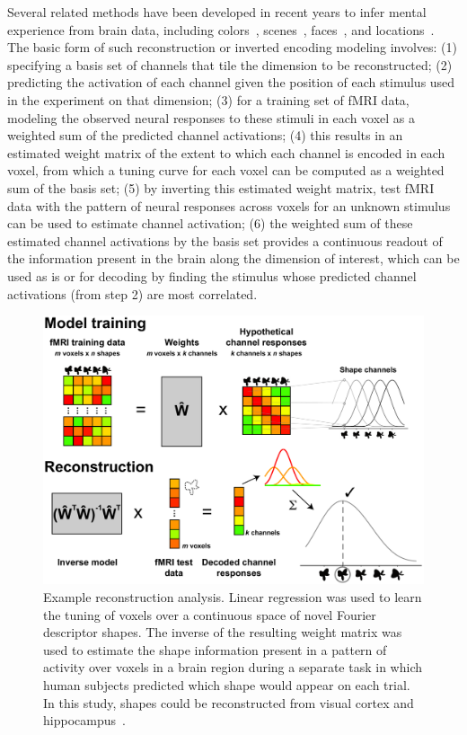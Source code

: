 Several related methods have been developed in recent years to infer
mental experience from brain data, including
colors~\citep{Brouwer:2009}, scenes~\citep{Naselaris:2009},
faces~\citep{Cowen:2014}, and locations~\citep{Sprague:2016}. The
basic form of such reconstruction or inverted encoding modeling
involves: (1) specifying a basis set of channels that tile the
dimension to be reconstructed; (2) predicting the activation of each
channel given the position of each stimulus used in the experiment on
that dimension; (3) for a training set of fMRI data, modeling the
observed neural responses to these stimuli in each voxel as a weighted
sum of the predicted channel activations; (4) this results in an
estimated weight matrix of the extent to which each channel is encoded
in each voxel, from which a tuning curve for each voxel can be
computed as a weighted sum of the basis set; (5) by inverting this
estimated weight matrix, test fMRI data with the pattern of neural
responses across voxels for an unknown stimulus can be used to
estimate channel activation; (6) the weighted sum of these estimated
channel activations by the basis set provides a continuous readout of
the information present in the brain along the dimension of interest,
which can be used as is or for decoding by finding the stimulus whose
predicted channel activations (from step 2) are most correlated.

\setlength{\columnsep}{20pt}
\begin{figure}
\centering
\includegraphics[width=.49\textwidth]{figs/inverse}
\caption{\small Example reconstruction analysis. Linear regression was
used to learn the tuning of voxels over a continuous space of novel
Fourier descriptor shapes. The inverse of the resulting weight matrix
was used to estimate the shape information present in a pattern of
activity over voxels in a brain region during a separate task in which
human subjects predicted which shape would appear on each trial.
In this study, shapes could be reconstructed from visual cortex and
hippocampus~\citep{Kok:2018}.}
    \label{fig:hippo}
    \vskip2pt
\end{figure}

